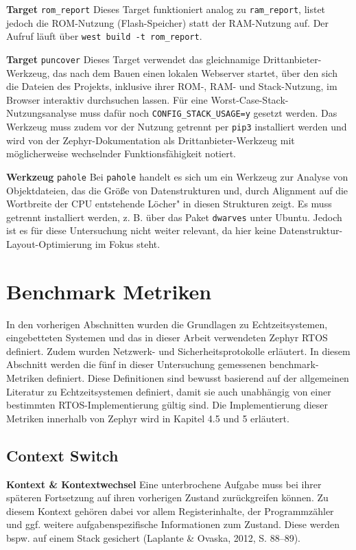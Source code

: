 \textbf{Target }\lstinline[style=fileinline]|rom_report| Dieses Target funktioniert analog zu \lstinline[style=fileinline]|ram_report|, listet jedoch die ROM-Nutzung (Flash-Speicher) statt der RAM-Nutzung auf. Der Aufruf l{\"a}uft {\"u}ber \lstinline[style=fileinline]|west build -t rom_report|.

\textbf{Target }\lstinline[style=fileinline]|puncover| Dieses Target verwendet das gleichnamige Drittanbieter-Werkzeug, das nach dem Bauen einen lokalen Webserver startet, {\"u}ber den sich die Dateien des Projekts, inklusive ihrer ROM-, RAM- und Stack-Nutzung, im Browser interaktiv durchsuchen lassen. F{\"u}r eine Worst-Case-Stack-Nutzungsanalyse muss daf{\"u}r noch \lstinline[style=fileinline]|CONFIG_STACK_USAGE=y| gesetzt werden. Das Werkzeug muss zudem vor der Nutzung getrennt per \lstinline[style=fileinline]|pip3| installiert werden und wird von der Zephyr-Dokumentation als Drittanbieter-Werkzeug mit m{\"o}glicherweise wechselnder Funktionsf{\"a}higkeit notiert.

\textbf{Werkzeug }\lstinline[style=fileinline]|pahole| Bei \lstinline[style=fileinline]|pahole| handelt es sich um ein Werkzeug zur Analyse von Objektdateien, das die Gr{\"o}{\ss}e von Datenstrukturen und, durch Alignment auf die Wortbreite der CPU entstehende \glqq{}L{\"o}cher" in diesen Strukturen zeigt. Es muss getrennt installiert werden, z. B. {\"u}ber das Paket \lstinline[style=fileinline]|dwarves| unter Ubuntu. Jedoch ist es f{\"u}r diese Untersuchung nicht weiter relevant, da hier keine Datenstruktur-Layout-Optimierung im Fokus steht.

\section{Benchmark Metriken}
In den vorherigen Abschnitten wurden die Grundlagen zu Echtzeitsystemen, eingebetteten Systemen und das in dieser Arbeit verwendeten Zephyr RTOS definiert. Zudem wurden Netzwerk- und Sicherheitsprotokolle erl{\"a}utert. In diesem Abschnitt werden die f{\"u}nf in dieser Untersuchung gemessenen benchmark-Metriken definiert. Diese Definitionen sind bewusst basierend auf der allgemeinen Literatur zu Echtzeitsystemen definiert, damit sie auch unabh{\"a}ngig von einer bestimmten RTOS-Implementierung g{\"u}ltig sind. Die Implementierung dieser Metriken innerhalb von Zephyr wird in Kapitel 4.5 und 5 erl{\"a}utert.

\subsection{Context Switch}
\textbf{Kontext \& Kontextwechsel }Eine unterbrochene Aufgabe muss bei ihrer sp{\"a}teren Fortsetzung auf ihren vorherigen Zustand zur{\"u}ckgreifen k{\"o}nnen. Zu diesem Kontext geh{\"o}ren dabei vor allem Registerinhalte, der Programmz{\"a}hler und ggf. weitere aufgabenspezifische Informationen zum Zustand. Diese werden bspw. auf einem Stack gesichert (Laplante \& Ovaska, 2012, S. 88--89).

